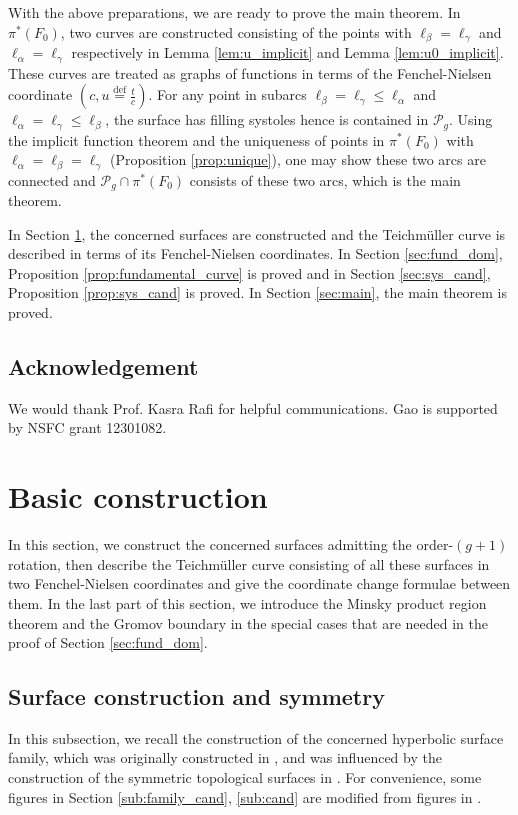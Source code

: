 \documentclass[UTF8]{amsart}
\numberwithin{equation}{section}
\theoremstyle{definition}
\theoremstyle{example}
\theoremstyle{remark}
\begin{document}
With the above preparations, we are ready to prove the main theorem. In $\pi^{*}(F_0)$, two curves are constructed consisting of the points with $\ell_{\beta} = \ell_{\gamma}$ and $\ell_{\alpha} = \ell_{\gamma}$ respectively in Lemma \ref{lem:u_implicit} and Lemma \ref{lem:u0_implicit}. These curves are treated as graphs of functions in terms of the Fenchel-Nielsen coordinate $\left( c, u\overset{\mathrm{def}}{=} \frac{t}{c} \right) $. For any point in subarcs $\ell_{\beta} = \ell_{\gamma} \le \ell_{\alpha}$ and $\ell_{\alpha} = \ell_{\gamma} \le \ell_{\beta}$, the surface has filling systoles hence is contained in $\mathcal{P}_g$. Using the implicit function theorem and the uniqueness of points in $\pi^{*}(F_0)$ with $\ell_{\alpha} = \ell_{\beta} = \ell_{\gamma} $ (Proposition \ref{prop:unique}), one may show these two arcs are connected and $\mathcal{P}_g\cap \pi^{*}(F_0)$ consists of these two arcs, which is the main theorem. 

In Section \ref{sec:pre}, the concerned surfaces are constructed and the Teichm\"uller curve is described in terms of its Fenchel-Nielsen coordinates. In Section \ref{sec:fund_dom}, Proposition \ref{prop:fundamental_curve} is proved and in Section \ref{sec:sys_cand}, Proposition \ref{prop:sys_cand} is proved. In Section \ref{sec:main}, the main theorem is proved. 

\subsection*{Acknowledgement} We would thank Prof. Kasra Rafi for helpful communications. 
Gao is supported by NSFC grant 12301082.



\section{Basic construction} \label{sec:pre}
In this section, we construct the concerned surfaces admitting the order-$(g+1)$ rotation, then describe the Teichm\"uller curve consisting of all these surfaces in two Fenchel-Nielsen coordinates and give the coordinate change formulae between them. In the last part of this section, we introduce the Minsky product region theorem and the Gromov boundary in the special cases that are needed in the proof of Section \ref{sec:fund_dom}.
\subsection{Surface construction and symmetry}
In this subsection, we recall the construction of the concerned hyperbolic surface family, which was  originally constructed in \cite{gao2023maximal}, and was influenced by the construction of the symmetric topological surfaces in \cite{wang2015embedding}. For convenience, some figures in Section \ref{sub:family_cand}, \ref{sub:cand} are modified from figures in \cite{gao2023maximal}. 
\end{document}
